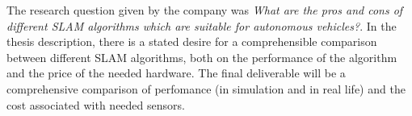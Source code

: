 The research question given by the company was \textit{What are the pros and 
    cons of different SLAM algorithms which are suitable for autonomous vehicles?}.
In the thesis description, there is a stated desire for a comprehensible 
comparison between different SLAM algorithms, both on the performance of the 
algorithm and the price of the needed hardware. The final deliverable will be a
comprehensive comparison of perfomance (in simulation and in real life) and the
cost associated with needed sensors.
